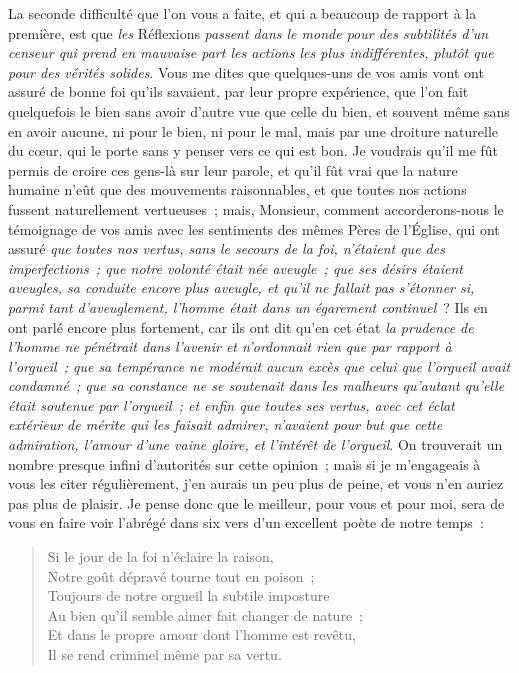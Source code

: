 \documentclass[french,twoside]{book} %
\begin{document}
La seconde difficulté que l’on vous a faite, et qui a beaucoup de rapport à la première, est que {\itshape les} Réflexions {\itshape passent dans le monde pour des subtilités d’un censeur qui prend en mauvaise part les actions les plus indifférentes, plutôt que pour des vérités solides}. Vous me dites que quelques-uns de vos amis vont ont assuré de bonne foi qu’ils savaient, par leur propre expérience, que l’on fait quelquefois le bien sans avoir d’autre vue que celle du bien, et souvent même sans en avoir aucune, ni pour le bien, ni pour le mal, mais par une droiture naturelle du cœur, qui le porte sans y penser vers ce qui est bon. Je voudrais qu’il me fût permis de croire ces gens-là sur leur parole, et qu’il fût vrai que la nature humaine n’eût que des mouvements raisonnables, et que toutes nos actions fussent naturellement vertueuses ; mais, Monsieur, comment accorderons-nous le témoignage de vos amis avec les sentiments des mêmes Pères de l’Église, qui ont assuré {\itshape que toutes nos vertus, sans le secours de la foi, n’étaient que des imperfections ; que notre volonté était née aveugle ; que ses désirs étaient aveugles, sa conduite encore plus aveugle, et qu’il ne fallait pas s’étonner si, parmi tant d’aveuglement, l’homme était dans un égarement continuel} ? Ils en ont parlé encore plus fortement, car ils ont dit qu’en cet état {\itshape la prudence de l’homme ne pénétrait dans l’avenir et n’ordonnait rien que par rapport à l’orgueil ; que sa tempérance ne modérait aucun excès que celui que l’orgueil avait condamné ; que sa constance ne se soutenait dans les malheurs qu’autant qu’elle était soutenue par l’orgueil ; et enfin que toutes ses vertus, avec cet éclat extérieur de mérite qui les faisait admirer, n’avaient pour but que cette admiration, l’amour d’une vaine gloire, et l’intérêt de l’orgueil}. On trouverait un nombre presque infini d’autorités sur cette opinion ; mais si je m’engageais à vous les citer régulièrement, j’en aurais un peu plus de peine, et vous n’en auriez pas plus de plaisir. Je pense donc que le meilleur, pour vous et pour moi, sera de vous en faire voir l’abrégé dans six vers d’un excellent poète de notre temps :\par


\begin{verse}
Si le jour de la foi n’éclaire la raison,\\
Notre goût dépravé tourne tout en poison ;\\
Toujours de notre orgueil la subtile imposture\\
Au bien qu’il semble aimer fait changer de nature ;\\
Et dans le propre amour dont l’homme est revêtu,\\
Il se rend criminel même par sa vertu.\\
\end{verse}
\end{document}
